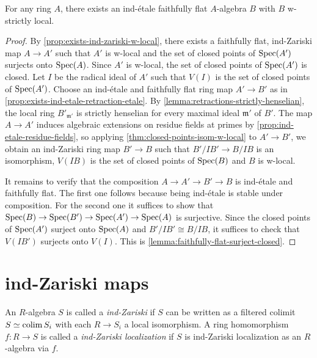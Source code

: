 \begin{proposition}
    For any ring \(A\), there exists an ind-étale faithfully flat \(A\)-algebra \(B\) with \(B\) w-strictly local.
    \label{thm:ind-etale-w-strictly-local-cover}
\end{proposition}

\begin{proof}
    By \ref{prop:exists-ind-zariski-w-local}, there exists a faithfully flat, ind-Zariski map
    $A \to A'$ such that $A'$ is w-local and the set of closed points of $\mathrm{Spec}(A')$ surjects
    onto $\mathrm{Spec}(A)$. Since $A'$ is w-local, the set of closed points of $\mathrm{Spec}(A')$ is closed.
    Let $I$ be the radical ideal of $A'$ such that $V(I)$ is the set of closed points of $\mathrm{Spec}(A')$.
    Choose an ind-étale and faithfully flat ring map $A' \to B'$ as in
    \ref{prop:exists-ind-etale-retraction-etale}. By
    \ref{lemma:retractions-strictly-henselian}, the local ring $B'_{\mathfrak{m}'}$ is
    strictly henselian for every maximal ideal $\mathfrak{m}'$ of $B'$.
    The map $A \to A'$ induces algebraic extensions on residue fields at primes by
    \ref{prop:ind-etale-residue-fields},
    so applying \ref{thm:closed-points-isom-w-local} to $A' \to B'$, we obtain
    an ind-Zariski ring map $B' \to B$ such that $B'/IB' \to B/IB$ is an isomorphism,
    $V(IB)$ is the set of closed points of $\mathrm{Spec}(B)$ and $B$ is w-local.

    It remains to verify that the composition $A \to A' \to B' \to B$ is ind-étale and faithfully flat.
    The first one follows because being ind-étale is stable under composition. For the second
    one it suffices to show that $\mathrm{Spec}(B) \to \mathrm{Spec}(B') \to \mathrm{Spec}(A') \to \mathrm{Spec}(A)$ is surjective.
    Since the closed points of $\mathrm{Spec}(A')$ surject onto $\mathrm{Spec}(A)$ and $B' / IB' \cong B / I B$, it
    suffices to check that $V(IB')$ surjects onto $V(I)$. This is \ref{lemma:faithfully-flat-surject-closed}.
\end{proof}

\section{ind-Zariski maps}

\begin{definition}
    \label{def:ind-Zariski}

    An $R$-algebra $S$ is called a \emph{ind-Zariski} if $S$ can be written as a filtered colimit $S \simeq \operatorname{colim} S_i$ with each $R \to S_i$ a local isomorphism. A ring homomorphism $f : R \to S$ is called a \emph{ind-Zariski localization} if $S$ is ind-Zariski localization as an $R$-algebra via $f$.

\end{definition}

